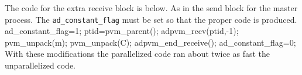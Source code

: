 \endexample
The code for the extra receive block is below. As in the send block for the
master process.  The {\tt ad\_constant\_flag} must be set so that the proper code is
produced.
\beginexample
   ad_constant_flag=1;
   ptid=pvm_parent();
   adpvm_recv(ptid,-1);
   pvm_unpack(m); 
   pvm_unpack(C); 
   adpvm_end_receive();
   ad_constant_flag=0;
\endexample
With these modifications the parallelized code ran about twice as fast
the unparallelized code.
